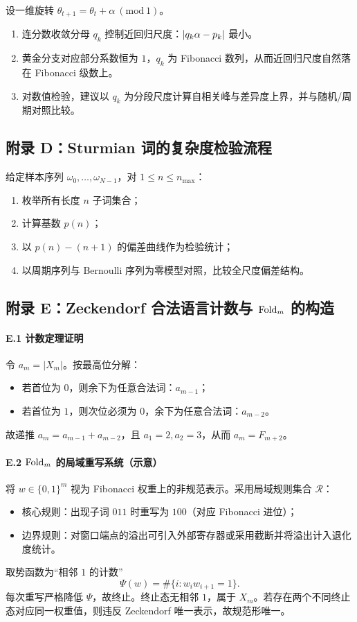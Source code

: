 设一维旋转 $\theta_{t+1}=\theta_t+\alpha\ (\mathrm{mod}\ 1)$。
\begin{enumerate}
  \item 连分数收敛分母 $q_k$ 控制近回归尺度：$\left\lvert q_k\alpha-p_k\right\rvert$ 最小。
  \item 黄金分支对应部分系数恒为 $1$，$q_k$ 为 Fibonacci 数列，从而近回归尺度自然落在 Fibonacci 级数上。
  \item 对数值检验，建议以 $q_k$ 为分段尺度计算自相关峰与差异度上界，并与随机/周期对照比较。
\end{enumerate}

\subsection{附录 D：Sturmian 词的复杂度检验流程}
\label{app:sturmian-test}

给定样本序列 $\omega_0,\dots,\omega_{N-1}$，对 $1\le n\le n_{\max}$：
\begin{enumerate}
  \item 枚举所有长度 $n$ 子词集合；
  \item 计算基数 $p(n)$；
  \item 以 $p(n)-(n+1)$ 的偏差曲线作为检验统计；
  \item 以周期序列与 Bernoulli 序列为零模型对照，比较全尺度偏差结构。
\end{enumerate}

\subsection{附录 E：Zeckendorf 合法语言计数与 \texorpdfstring{$\mathrm{Fold}_m$}{Fold\_m} 的构造}
\label{app:zeckendorf-fold}

\paragraph{E.1 计数定理证明}
令 $a_m=|X_m|$。按最高位分解：
\begin{itemize}
  \item 若首位为 $0$，则余下为任意合法词：$a_{m-1}$；
  \item 若首位为 $1$，则次位必须为 $0$，余下为任意合法词：$a_{m-2}$。
\end{itemize}
故递推 $a_m=a_{m-1}+a_{m-2}$，且 $a_1=2,a_2=3$，从而 $a_m=F_{m+2}$。

\paragraph{E.2 $\mathrm{Fold}_m$ 的局域重写系统（示意）}
将 $w\in\{0,1\}^m$ 视为 Fibonacci 权重上的非规范表示。采用局域规则集合 $\mathcal{R}$：
\begin{itemize}
  \item 核心规则：出现子词 $011$ 时重写为 $100$（对应 Fibonacci 进位）；
  \item 边界规则：对窗口端点的溢出可引入外部寄存器或采用截断并将溢出计入退化度统计。
\end{itemize}
取势函数为“相邻 $1$ 的计数”
\[
\Psi(w)=\#\{i: w_iw_{i+1}=1\}.
\]
每次重写严格降低 $\Psi$，故终止。终止态无相邻 $1$，属于 $X_m$。若存在两个不同终止态对应同一权重值，则违反 Zeckendorf 唯一表示，故规范形唯一。

